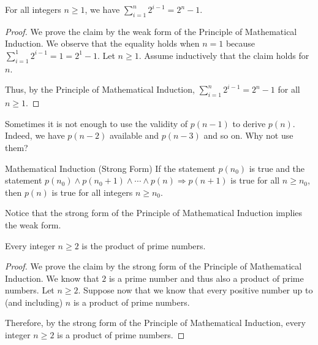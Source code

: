 \begin{lemma}
    For all integers $n \geq 1$, we have $\sum_{i=1}^n 2^{i-1} = 2^n-1$.
\end{lemma}
\begin{proof}
    We prove the claim by the weak form of the
    Principle of Mathematical Induction.
    We observe that the equality holds when $n=1$
    because $\sum_{i=1}^1 2^{i-1} = 1 = 2^1-1$.
    Let $n \geq 1$.
    Assume inductively that the claim holds for $n$.
    \practice

    Thus, by the Principle of Mathematical Induction,
    $\sum_{i=1}^n 2^{i-1} = 2^n -1$ for all $n \geq 1$.
\end{proof}

Sometimes it is not enough to use the validity of $p(n-1)$ to derive $p(n)$.
Indeed, we have $p(n-2)$ available and $p(n-3)$ and so on.
Why not use them?
\begin{definition}{Mathematical Induction (Strong Form)}
    If the statement $p(n_0)$ is true and the statement
    $p(n_0) \wedge p(n_0+1) \wedge \cdots \wedge p(n) \Rightarrow p(n+1)$
    is true for all $n \geq n_0$,
    then $p(n)$ is true for all integers $n \geq n_0$.
\end{definition}
Notice that the strong form of the Principle of Mathematical Induction
implies the weak form.

\pagebreak
\begin{lemma}
    Every integer $n \geq 2$ is the product of prime numbers.
\end{lemma}
\begin{proof}
    We prove the claim by the strong form of the
    Principle of Mathematical Induction.
    We know that $2$ is a prime number and thus also a product of prime numbers.
    Let $n \geq 2$.
    Suppose now that we know that every positive number up to (and including) $n$ is
    a product of prime numbers.
    \practice

    Therefore, by the strong form of the Principle of Mathematical Induction,
    every integer $n \geq 2$ is a product of prime numbers.
\end{proof}

